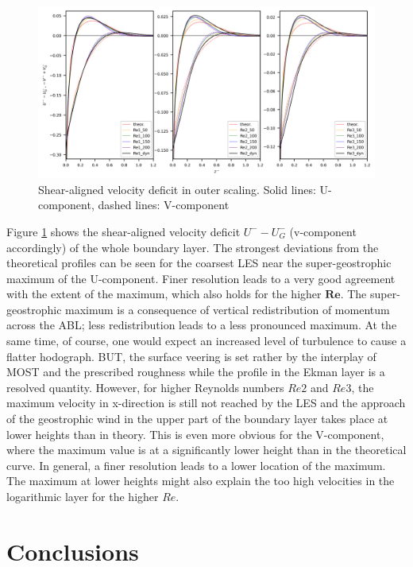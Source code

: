 \documentclass[draft,a4paper,11pt]{article}
\newcommand{\RE}{\mathbf{Re}}
\begin{document}
\begin{figure}[ht]
  \centerline{
	\includegraphics[width=\textwidth]{figures_2024/d3y_3Re_Ekman_lin.png}
}
  \caption{Shear-aligned velocity deficit in outer scaling. Solid lines: U-component, dashed lines: V-component}
  \label{3Re_Ekman}
\end{figure}

Figure \ref{3Re_Ekman} shows the shear-aligned velocity deficit $U^--U^-_G$ (v-component accordingly) of the whole boundary layer. The strongest deviations from the theoretical profiles can be seen for the coarsest LES near the super-geostrophic maximum of the U-component. Finer resolution leads to a very good agreement with the extent of the maximum, which also holds for the higher $\RE$. The super-geostrophic maximum is a consequence of vertical redistribution of momentum across the ABL; less redistribution leads to a less pronounced maximum. At the same time, of course, one would expect an increased level of turbulence to cause a flatter hodograph. BUT, the surface veering is set rather by the interplay of MOST and the prescribed roughness while the profile in the Ekman layer is a resolved quantity. However, for higher Reynolds numbers $Re2$ and $Re3$, the maximum velocity in x-direction is still not reached by the LES and the approach of the geostrophic wind in the upper part of the boundary layer takes place at lower heights than in theory. This is even more obvious for the V-component, where the maximum value is at a significantly lower height than in the theoretical curve. In general, a finer resolution leads to a lower location of the maximum. The maximum at lower heights might also explain the too high velocities in the logarithmic layer for the higher $Re$. 


\section{Conclusions}
\label{conclusion}
\end{document}
